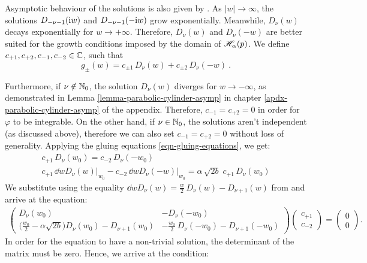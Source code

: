 Asymptotic behaviour of the solutions is also given by \cite{GradshteynRyzhik}. As $|w|\to\infty$, the solutions $D_{-\nu-1}(\mathrm{i} w)$ and $D_{-\nu-1}(-\mathrm{i} w)$ grow exponentially. Meanwhile, $D_\nu(w)$ decays exponentially for $w \to +\infty$. Therefore, $D_\nu(w)$ and $D_\nu(-w)$ are better suited for the growth conditions imposed by the domain of $\mathscr{H}_\alpha(p)$. We define $c_{+1}, c_{+2}, c_{-1}, c_{-2} \in \mathbb{C}$, such that
\begin{equation}
    g_\pm(w) = c_{\pm 1} \, D_\nu(w) + c_{\pm 2} \, D_\nu(-w) \: .
    \label{eqn-dirac-parabolic-cylinder-two-solutions}
\end{equation}

Furthermore, if $\nu \notin \mathbb{N}_0$, the solution $D_\nu(w)$ diverges for $w \to -\infty$, as demonstrated in Lemma \ref{lemma-parabolic-cylinder-asymp} in chapter \ref{apdx-parabolic-cylinder-asymp} of the appendix. Therefore, $c_{-1} = c_{+2} = 0$ in order for $\varphi$ to be integrable. On the other hand, if $\nu \in \mathbb{N}_0$, the solutions aren't independent (as discussed above), therefore we can also set $c_{-1} = c_{+2} = 0$ without loss of generality. Applying the gluing equations \eqref{eqn-gluing-equations}, we get:
\begin{gather*}
    c_{+1} \, D_\nu(w_0) = c_{-2} \, D_\nu(-w_0) \\[5pt]
    c_{+1} \, \dd{}{w} D_\nu(w) \big|_{w_0} - c_{-2} \, \dd{}{w} D_\nu(-w) \big|_{w_0} = \alpha \, \sqrt{2b} \; c_{+1} \, D_\nu(w_0)
\end{gather*}
We substitute using the equality $\dd{}{w} D_\nu(w) = \frac{w}{2} \, D_\nu(w) - D_{\nu+1}(w)$ from \cite{GradshteynRyzhik} and arrive at the equation:
\begin{align*}
    \begin{pmatrix}
        D_\nu(w_0) & -D_\nu(-w_0) \\[5pt]
        \big( \frac{w_0}{2} \!-\! \alpha \sqrt{2b} \big)
        D_\nu(w_0) \!-\! D_{\nu+1}(w_0) &
        -\frac{w_0}{2} \, D_\nu(-w_0) \!-\! D_{\nu+1}(-w_0)
    \end{pmatrix}
    \begin{pmatrix}
        c_{+1} \\[5pt] c_{-2}
    \end{pmatrix}
    =
    \begin{pmatrix}
        0 \\[5pt] 0
    \end{pmatrix}
    .
\end{align*}
In order for the equation to have a non-trivial solution, the determinant of the matrix must be zero. Hence, we arrive at the condition:
